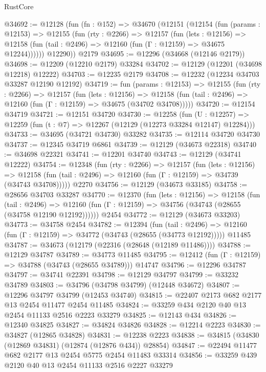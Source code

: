 \begin{lexlean}{RustCore}
\begin{coremodule}
@34692 := @12128
    (fun (fn : @152) =>
    @34670
      (@12151
        (@12154
          (fun (params : @12153) =>
          @12155
            (fun (rty : @2266) =>
            @12157
              (fun (lets : @12156) =>
              @12158 (fun (tail : @2496) => @12160 (fun (Γ : @12159) => @34675 @12244))))))
        @12290))
    @2179
@34695 := @12296 (@34668 (@12146 @2179))
@34698 := @12209 (@12210 @2179) @33284
@34702 := @12129 (@12201 (@34698 @12218) @12222)
@34703 := @12235 @2179
@34708 := @12232 (@12234 @34703 @33287 @12190 @12192)
@34719 := fun (params : @12153) =>
  @12155
    (fun (rty : @2266) =>
    @12157
      (fun (lets : @12156) =>
      @12158 (fun (tail : @2496) => @12160 (fun (Γ : @12159) => @34675 (@34702 @34708)))))
@34720 := @12154 @34719
@34721 := @12151 @34720
@34730 := @12258
    (fun (U : @12257) => @12259 (fun (t : @7) => @12267 (@12129 (@12273 @33284 @12147) @12284)))
@34733 := @34695 (@34721 @34730) @33282
@34735 := @12114 @34720 @34730
@34737 := @12345 @34719 @6861
@34739 := @12129 (@34673 @22318)
@34740 := @34698 @22321
@34741 := @12201 @34740
@34743 := @12129 (@34741 @12222)
@34754 := @12348
    (fun (rty : @2266) =>
    @12157
      (fun (lets : @12156) =>
      @12158 (fun (tail : @2496) => @12160 (fun (Γ : @12159) => @34739 (@34743 @34708)))))
    @2270
@34756 := @12129 (@34673 @33185)
@34758 := @28656 @34703 @33287
@34770 := @12370
    (fun (lets : @12156) =>
    @12158
      (fun (tail : @2496) =>
      @12160 (fun (Γ : @12159) => @34756 (@34743 (@28655 (@34758 @12190 @12192))))))
    @2454
@34772 := @12129 (@34673 @33203)
@34773 := @34758 @2454
@34782 := @12394
    (fun (tail : @2496) => @12160 (fun (Γ : @12159) => @34772 (@34743 (@28655 (@34773 @12192)))))
    @11485
@34787 := @34673 (@12179 (@22316 (@28648 (@12189 @11486))))
@34788 := @12129 @34787
@34789 := @34773 @11485
@34795 := @12412 (fun (Γ : @12159) => @34788 (@34743 (@28655 @34789))) @14747
@34796 := @12296 @34787
@34797 := @34741 @22391
@34798 := @12129 @34797
@34799 := @33232 @34789
@34803 := @34796 (@34798 @34799) (@12448 @34672)
@34807 := @12296 @34797 @34799 (@12453 @34740)
@34815 := @22407 @2173 @682 @2177 @13 @2454 @11477 @2454 @11485
@34824 := @33259 @434 @2120 @40 @13 @2454 @11133 @2516 @2223 @33279
@34825 := @12143 @434
@34826 := @12340 @34825
@34827 := @34824 @34826
@34828 := @12214 @2223
@34830 := @34827 (@12865 @34828)
@34831 := @12238 @2223
@34838 := @34815 (@34830 (@12869 @34831) (@12874 (@12876 @434)) @28854)
@34847 := @22494 @11477 @682 @2177 @13 @2454 @5775 @2454 @11483 @33314
@34856 := @33259 @439 @2120 @40 @13 @2454 @11133 @2516 @2227 @33279

\end{coremodule}
\end{lexlean}
